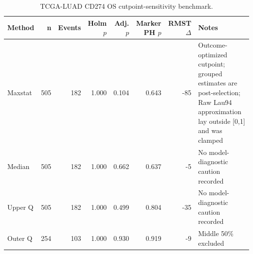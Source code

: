 \begin{table}[t]
\centering
\caption{TCGA-LUAD CD274 OS cutpoint-sensitivity benchmark.}
\label{tab:luad-cd274-os-cutpoints}
\begin{tabular}{lrrrrrrl}
\toprule
Method & n & Events & Holm $p$ & Adj. $p$ & Marker PH $p$ & RMST $\Delta$ & Notes \\
\midrule
Maxstat & 505 & 182 & 1.000 & 0.104 & 0.643 & -85 & Outcome-optimized cutpoint; grouped estimates are post-selection; Raw Lau94 approximation lay outside [0,1] and was clamped \\
Median & 505 & 182 & 1.000 & 0.662 & 0.637 & -5 & No model-diagnostic caution recorded \\
Upper Q & 505 & 182 & 1.000 & 0.499 & 0.804 & -35 & No model-diagnostic caution recorded \\
Outer Q & 254 & 103 & 1.000 & 0.930 & 0.919 & -9 & Middle 50\% excluded \\
\bottomrule
\end{tabular}
\end{table}
